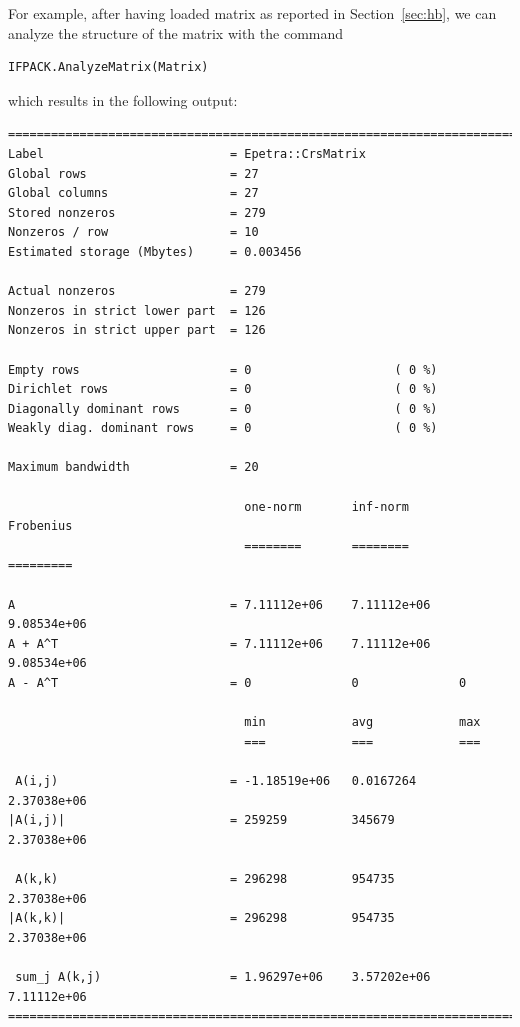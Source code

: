 \documentclass[10pt,relax]{SANDreport}
\begin{document}
For example, after having loaded matrix as reported in Section~\ref{sec:hb},
  we can analyze the structure of the matrix with the command
\begin{verbatim}
IFPACK.AnalyzeMatrix(Matrix)
\end{verbatim}
which results in the following output:
\begin{verbatim}
================================================================================
Label                          = Epetra::CrsMatrix
Global rows                    = 27
Global columns                 = 27
Stored nonzeros                = 279
Nonzeros / row                 = 10
Estimated storage (Mbytes)     = 0.003456

Actual nonzeros                = 279
Nonzeros in strict lower part  = 126
Nonzeros in strict upper part  = 126

Empty rows                     = 0                    ( 0 %)
Dirichlet rows                 = 0                    ( 0 %)
Diagonally dominant rows       = 0                    ( 0 %)
Weakly diag. dominant rows     = 0                    ( 0 %)

Maximum bandwidth              = 20

                                 one-norm       inf-norm       Frobenius
                                 ========       ========       =========

A                              = 7.11112e+06    7.11112e+06    9.08534e+06
A + A^T                        = 7.11112e+06    7.11112e+06    9.08534e+06
A - A^T                        = 0              0              0

                                 min            avg            max
                                 ===            ===            ===

 A(i,j)                        = -1.18519e+06   0.0167264      2.37038e+06
|A(i,j)|                       = 259259         345679         2.37038e+06

 A(k,k)                        = 296298         954735         2.37038e+06
|A(k,k)|                       = 296298         954735         2.37038e+06

 sum_j A(k,j)                  = 1.96297e+06    3.57202e+06    7.11112e+06
================================================================================
\end{verbatim}
\end{document}
